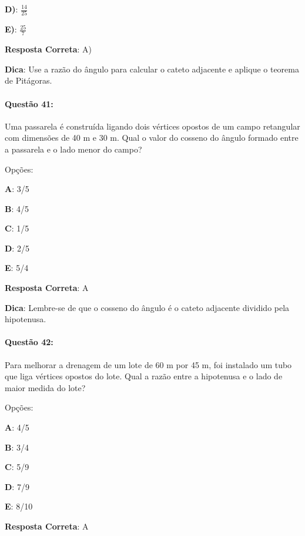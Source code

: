\documentclass{article}
\begin{document}
\textbf{D)}: \( \frac{14}{25} \) 

\textbf{E)}: \( \frac{25}{7} \) 

\vspace{\baselineskip}\textbf{Resposta Correta}: A)

\vspace{\baselineskip}\textbf{Dica}: Use a razão do ângulo para calcular o cateto adjacente e aplique o teorema de Pitágoras.

\paragraph{Questão 41:}
{Uma passarela é construída ligando dois vértices opostos de um campo retangular com dimensões de 40 m e 30 m. Qual o valor do cosseno do ângulo formado entre a passarela e o lado menor do campo?}

\vspace{\baselineskip}Opções:

\vspace{\baselineskip}\textbf{A}: 3/5 

\textbf{B}: 4/5 

\textbf{C}: 1/5 

\textbf{D}: 2/5 

\textbf{E}: 5/4 

\vspace{\baselineskip}\textbf{Resposta Correta}: A

\vspace{\baselineskip}\textbf{Dica}: Lembre-se de que o cosseno do ângulo é o cateto adjacente dividido pela hipotenusa.

\paragraph{Questão 42:}
{Para melhorar a drenagem de um lote de 60 m por 45 m, foi instalado um tubo que liga vértices opostos do lote. Qual a razão entre a hipotenusa e o lado de maior medida do lote?}

\vspace{\baselineskip}Opções:

\vspace{\baselineskip}\textbf{A}: 4/5 

\textbf{B}: 3/4 

\textbf{C}: 5/9 

\textbf{D}: 7/9 

\textbf{E}: 8/10 

\vspace{\baselineskip}\textbf{Resposta Correta}: A
\end{document}
